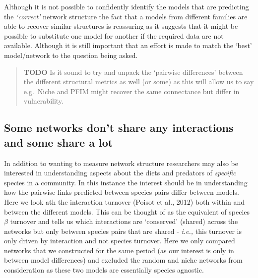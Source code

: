 \documentclass[
]{article}
\begin{document}
Although it is not possible to confidently identify the models that are
predicting the \emph{`correct'} network structure the fact that a models
from different families are able to recover similar structures is
reassuring as it suggests that it might be possible to substitute one
model for another if the required data are not available. Although it is
still important that an effort is made to match the `best' model/network
to the question being asked.

\begin{quote}
\textbf{TODO} Is it sound to try and unpack the `pairwise differences'
between the different structural metrics as well (or some) as this will
allow us to say e.g.~Niche and PFIM might recover the same connectance
but differ in vulnerability.
\end{quote}

\subsection{Some networks don't share any interactions and some share a
lot}\label{some-networks-dont-share-any-interactions-and-some-share-a-lot}

In addition to wanting to measure network structure researchers may also
be interested in understanding aspects about the diets and predators of
\emph{specific} species in a community. In this instance the interest
should be in understanding how the pairwise links predicted between
species pairs differ between models. Here we look ath the interaction
turnover (Poisot et al., 2012) both within and between the different
models. This can be thought of as the equivalent of species \(\beta\)
turnover and tells us which interactions are `conserved' (shared) across
the networks but only between species pairs that are shared -
\emph{i.e.,} this turnover is only driven by interaction and not species
turnover. Here we only compared networks that we constructed for the
same period (as our interest is only in between model differences) and
excluded the random and niche networks from consideration as these two
models are essentially species agnostic.
\end{document}
